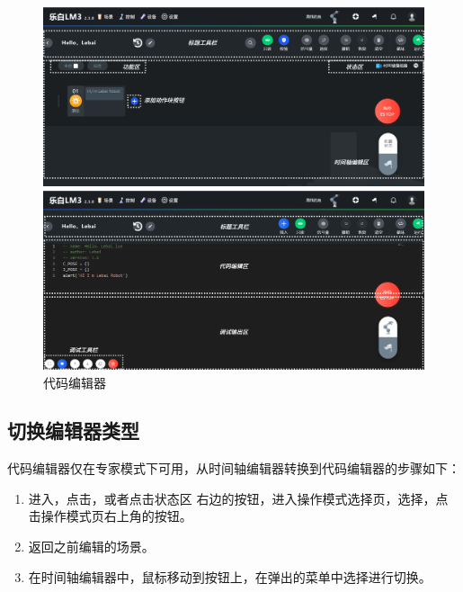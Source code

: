 	\begin{figure}[htb]
		\centering
		\includegraphics[width=\textwidth]{image/07/图3.1 时间轴编辑器 分区示意.png}
		\caption{时间轴编辑器
		}
		\label{fig:时间轴编辑器}

		\vfill

		\includegraphics[width=\textwidth]{image/07/图3.2 代码编辑器 分区示意图.png}
		\caption{代码编辑器}
		\label{fig:代码编辑器}
	\end{figure}


\subsection{切换编辑器类型}

代码编辑器仅在专家模式下可用，从时间轴编辑器转换到代码编辑器的步骤如下：
\begin{enumerate}
\item 进入，点击，或者点击状态区 右边的\colorbox{Black}{}按钮，进入操作模式选择页，选择，点击操作模式页右上角的按钮。
\item 返回之前编辑的场景。
\item 在时间轴编辑器中，鼠标移动到按钮上，在弹出的菜单中选择进行切换。
\end{enumerate}


